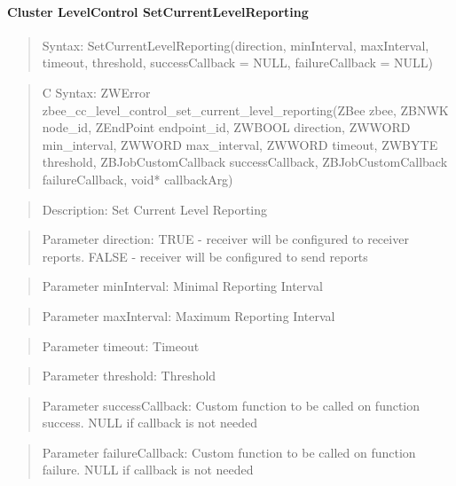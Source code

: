 \paragraph{Cluster LevelControl SetCurrentLevelReporting}
\begin{quote}Syntax: SetCurrentLevelReporting(direction, minInterval, maxInterval, timeout, threshold, successCallback = NULL, failureCallback = NULL)\end{quote}
\begin{quote}C Syntax: ZWError zbee\_cc\_level\_control\_set\_current\_level\_reporting(ZBee zbee, ZBNWK node\_id, ZEndPoint endpoint\_id, ZWBOOL direction, ZWWORD min\_interval, ZWWORD max\_interval, ZWWORD timeout, ZWBYTE threshold, ZBJobCustomCallback successCallback, ZBJobCustomCallback failureCallback, void* callbackArg)\end{quote}
\begin{quote}Description: Set Current Level Reporting\end{quote}
\begin{quote}Parameter direction: TRUE  - receiver will be configured to receiver reports. FALSE - receiver will be configured to send reports\end{quote}
\begin{quote}Parameter minInterval: Minimal Reporting Interval\end{quote}
\begin{quote}Parameter maxInterval: Maximum Reporting Interval\end{quote}
\begin{quote}Parameter timeout: Timeout\end{quote}
\begin{quote}Parameter threshold: Threshold\end{quote}
\begin{quote}Parameter successCallback: Custom function to be called on function success. NULL if callback is not needed\end{quote}
\begin{quote}Parameter failureCallback: Custom function to be called on function failure. NULL if callback is not needed\end{quote}


